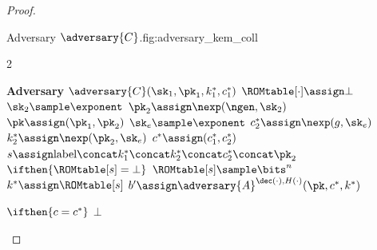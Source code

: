 \begin{proof}
\begin{itemize}
                                                                \begin{gamefigure}{Adversary $\adversary{C}$.}{fig:adversary_kem_coll}
                                                                    \begin{games}{2}
                                                                        \begin{gameenv}{\textbf{Adversary} $\adversary{C}(\sk_1, \pk_1, k_1^*, c_1^*)$}
                                                                            \State $\ROMtable[\cdot] \assign \bot$
                                                                            \State $\sk_2 \sample \exponent$
                                                                            \State $\pk_2 \assign \nexp(\ngen, \sk_2)$
                                                                            \State $\pk \assign (\pk_1, \pk_2)$
                                                                            \State $\sk_e \sample \exponent$
                                                                            \State $c^*_2 \assign \nexp(g, \sk_e)$
                                                                            \State $k^*_2 \assign \nexp(\pk_2, \sk_e)$
                                                                            \State $c^* \assign (c^*_1, c^*_2)$
                                                                            \State $s \assign \text{label} \concat k^*_1 \concat k^*_2 \concat c^*_2 \concat \pk_2$
                                                                            \State $\ifthen{\ROMtable[s] = \bot}$
                                                                                \State \quad $\ROMtable[s] \sample \bits^{n}$
                                                                                \State $k^* \assign \ROMtable[s]$
                                                                                \State $b' \assign \adversary{A}^{\dec(\cdot), H(\cdot)}(\pk, c^*, k^*)$
                                                                            \end{gameenv}
                                                                            \gamebreak
                                                                            \begin{gameenv}{\oracledec}
                                                                                \State $\ifthen{c = c^*}$
                                                                                    \State \quad \Return $\bot$

\end{gameenv}
\end{games}
\end{gamefigure}
\end{itemize}
\end{proof}
